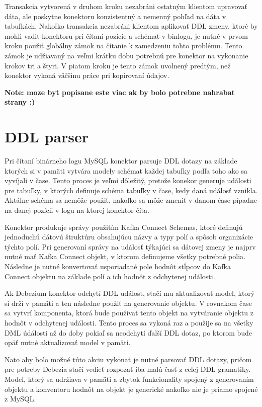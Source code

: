 Transakcia vytvorená v druhom kroku nezabráni ostatným klientom upravovať dáta, ale poskytne konektoru konzistentný a nemenný pohľad na dáta v tabuľkách. Nakoľko transakcia nezabráni klientom aplikovať DDL zmeny, ktoré by mohli vadiť konektoru pri čítaní pozície a schémat v binlogu, je nutné v prvom kroku použiť globálny zámok na čítanie k zamedzeniu tohto problému. Tento zámok je udžiavaný na veľmi krátku dobu potrebnú pre konektor na vykonanie krokov tri a štyri. V piatom kroku je tento zámok uvolnený predtým, než konektor vykoná väčšinu práce pri kopírovaní údajov.

\textbf{Note: moze byt popisane este viac ak by bolo potrebne nahrabat strany :)}

\section{DDL parser}
Pri čítaní binárneho logu MySQL konektor parsuje DDL dotazy na základe ktorých si v pamäti vytvára modely schémat každej tabuľky podľa toho ako sa vyvíjali v čase. Tento proces je veľmi dôležitý, pretože konekor generuje události pre tabuľky, v ktorých definuje schéma tabuľky v čase, kedy daná událosť vznikla. Aktálne schéma sa nemôže použiť, nakoľko sa môže zmeniť v danom čase pípadne na danej pozícii v logu na ktorej konektor číta. 

Konektor produkuje správy použitím Kafka Connect Schemas, ktoré definujú jednoduchú dátovú štruktúru obsahujúcu názvy a typy polí a spôsob organizácie týchto polí. Pri generovaní správy na událosť týkajúci sa dátovej zmeny je najprv nutné mať Kafka Connect  objekt, v ktorom definujeme všetky potrebné polia. Následne je nutné konvertovať usporiadané pole hodnôt stĺpcov do Kafka Connect  objektu na základe polí a ich hodnôt z odchytenej události.

Ak Debezium konektor odchytí DDL událost, stačí mu aktualizovať model, ktorý si drží v pamäti a ten následne použiť na generovanie  objektu. V rovnakom čase sa vytvrí komponenta, ktorá bude používať tento  objekt na vytváranie  objektu z hodnôt v odchytenej události. Tento proces sa vykoná raz a použije sa na všetky DML údálosti až do doby pokiaľ sa neodchytí ďalší DDL dotaz, po ktorom bude opäť nutné aktualizovať model v pamäti.

Nato aby bolo možné túto akciu vykonať je nutné parsovať DDL dotazy, pričom pre potreby Debezia stačí vedieť rozpozať iba malú časť z celej DDL gramatiky. Model, ktorý sa udržiava v pamäti a zbytok funkcionality spojený z generovaním  objektu a konventoru hodnôt na  objekt je generické nakoľko nie je priamo spojené z MySQL.

